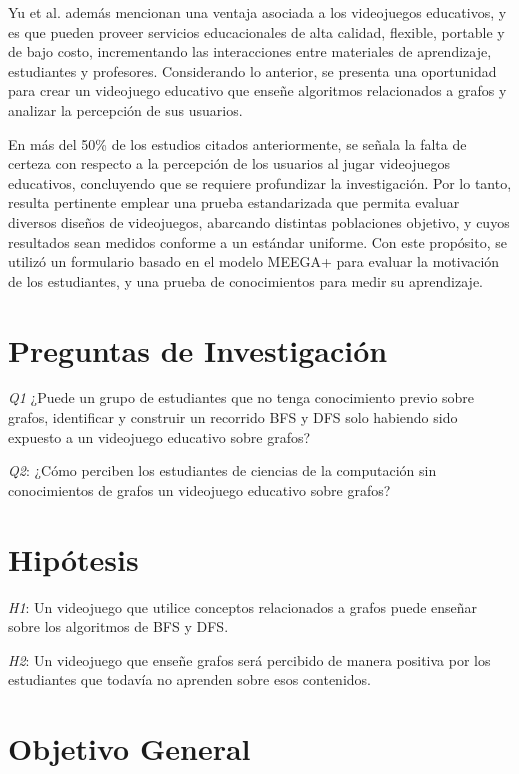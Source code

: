 Yu et al. \cite{Yu2020TheEffectsOfEducationGames} además mencionan una ventaja asociada a los videojuegos educativos, y es que pueden proveer servicios educacionales de alta calidad, flexible, portable y de bajo costo, incrementando las interacciones entre materiales de aprendizaje, estudiantes y profesores. Considerando lo anterior, se presenta una oportunidad para crear un videojuego educativo que enseñe algoritmos relacionados a grafos y analizar la percepción de sus usuarios.

En más del 50\% de los estudios citados anteriormente, se señala la falta de certeza con respecto a la percepción de los usuarios al jugar videojuegos educativos, concluyendo que se requiere profundizar la investigación. Por lo tanto, resulta pertinente emplear una prueba estandarizada que permita evaluar diversos diseños de videojuegos, abarcando distintas poblaciones objetivo, y cuyos resultados sean medidos conforme a un estándar uniforme. Con este propósito, se utilizó un formulario basado en el modelo MEEGA+ \cite{meegaplus} para evaluar la motivación de los estudiantes, y una prueba de conocimientos para medir su aprendizaje.


\section{Preguntas de Investigación}

\emph{Q1} ¿Puede un grupo de estudiantes que no tenga conocimiento previo sobre grafos, identificar y construir un recorrido BFS y DFS solo habiendo sido expuesto a un videojuego educativo sobre grafos?

\emph{Q2}: ¿Cómo perciben los estudiantes de ciencias de la computación sin conocimientos de grafos un videojuego educativo sobre grafos?


\section{Hipótesis}

\emph{H1}: Un videojuego que utilice conceptos relacionados a grafos puede enseñar sobre los algoritmos de BFS y DFS.

\emph{H2}: Un videojuego que enseñe grafos será percibido de manera positiva por los estudiantes que todavía no aprenden sobre esos contenidos.


\section{Objetivo General}


